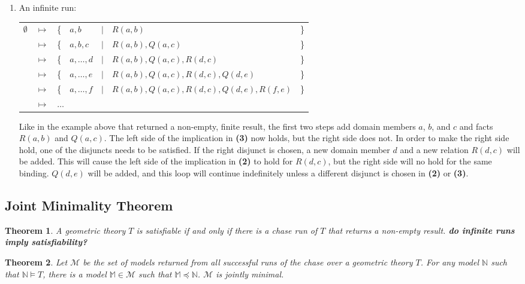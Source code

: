 \begin{enumerate}
		\item An infinite run:

			\begin{tabular}{lllllll}
				$\emptyset$ & $\mapsto$ & \{ & $a,b$        & $|$ & $R(a,b)$                                 & \} \\
				{}          & $\mapsto$ & \{ & $a,b,c$      & $|$ & $R(a,b), Q(a,c)$                         & \} \\
				{}          & $\mapsto$ & \{ & $a,\ldots,d$ & $|$ & $R(a,b), Q(a,c), R(d,c)$                 & \} \\
				{}          & $\mapsto$ & \{ & $a,\ldots,e$ & $|$ & $R(a,b), Q(a,c), R(d,c), Q(d,e)$         & \} \\
				{}          & $\mapsto$ & \{ & $a,\ldots,f$ & $|$ & $R(a,b), Q(a,c), R(d,c), Q(d,e), R(f,e)$ & \} \\
				{}          & $\mapsto$ & \multicolumn{5}{l}{ $\ldots$ }                                          \\
			\end{tabular}

			Like in the example above that returned a non-empty, finite result,
			the first two steps add domain members $a$, $b$, and $c$ and facts
			$R(a,b)$ and $Q(a,c)$. The left side of the implication in
			\textbf{(3)} now holds, but the right side does not. In order to
			make the right side hold, one of the disjuncts needs to be
			satisfied. If the right disjunct is chosen, a new domain member $d$
			and a new relation $R(d,c)$ will be added.  This will cause the
			left side of the implication in \textbf{(2)} to hold for $R(d,c)$,
			but the right side will no hold for the same binding. $Q(d,e)$ will
			be added, and this loop will continue indefinitely unless a
			different disjunct is chosen in \textbf{(2)} or \textbf{(3)}.

		\end{enumerate}

	\subsection{Joint Minimality Theorem}

		\newtheorem{theorem}{Theorem}

		\begin{theorem}
			A geometric theory $T$ is satisfiable if and only if there is a
			chase run of $T$ that returns a non-empty result.
			\textbf{ do infinite runs imply satisfiability? }
		\end{theorem}

		\begin{theorem}
			Let $\mathcal{M}$ be the set of models returned from all successful
			runs of the chase over a geometric theory $T$. For any model
			$\mathbb{N}$ such that $\mathbb{N} \models T$, there is a model
			$\mathbb{M} \in \mathcal{M}$ such that $\mathbb{M} \preceq
			\mathbb{N}$. $\mathcal{M}$ is jointly minimal.
		\end{theorem}
